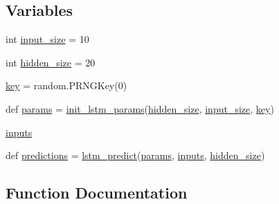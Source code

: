 \subsection*{Variables}
\begin{DoxyCompactItemize}
\item 
int \hyperlink{namespacelstm__en__JAX__python_a105f5427a708a0b2b3eb7ed1e551a956}{input\+\_\+size} = 10
\item 
int \hyperlink{namespacelstm__en__JAX__python_a43773b878a81b64380dbda3a42dc12ac}{hidden\+\_\+size} = 20
\item 
\hyperlink{namespacelstm__en__JAX__python_a69d278272de0d7f417fa3a912d7942c1}{key} = random.\+P\+R\+N\+G\+Key(0)
\item 
def \hyperlink{namespacelstm__en__JAX__python_aa48611ad29dd219713a46cc6d4691a76}{params} = \hyperlink{namespacelstm__en__JAX__python_a0ad26ee1f725cb54ad8b749930e094a8}{init\+\_\+lstm\+\_\+params}(\hyperlink{namespacelstm__en__JAX__python_a43773b878a81b64380dbda3a42dc12ac}{hidden\+\_\+size}, \hyperlink{namespacelstm__en__JAX__python_a105f5427a708a0b2b3eb7ed1e551a956}{input\+\_\+size}, \hyperlink{namespacelstm__en__JAX__python_a69d278272de0d7f417fa3a912d7942c1}{key})
\item 
\hyperlink{namespacelstm__en__JAX__python_a2e0078d9d0b56fa8efb5e5e7f1a6fb1c}{inputs}
\item 
def \hyperlink{namespacelstm__en__JAX__python_a3257f5a4a3e7a7fedaa56d2daf78c405}{predictions} = \hyperlink{namespacelstm__en__JAX__python_a11bf77a2c3fc11105d4d29944e565986}{lstm\+\_\+predict}(\hyperlink{namespacelstm__en__JAX__python_aa48611ad29dd219713a46cc6d4691a76}{params}, \hyperlink{namespacelstm__en__JAX__python_a2e0078d9d0b56fa8efb5e5e7f1a6fb1c}{inputs}, \hyperlink{namespacelstm__en__JAX__python_a43773b878a81b64380dbda3a42dc12ac}{hidden\+\_\+size})
\end{DoxyCompactItemize}


\subsection{Function Documentation}
\mbox{\label{namespacelstm__en__JAX__python_a0ad26ee1f725cb54ad8b749930e094a8}} 
